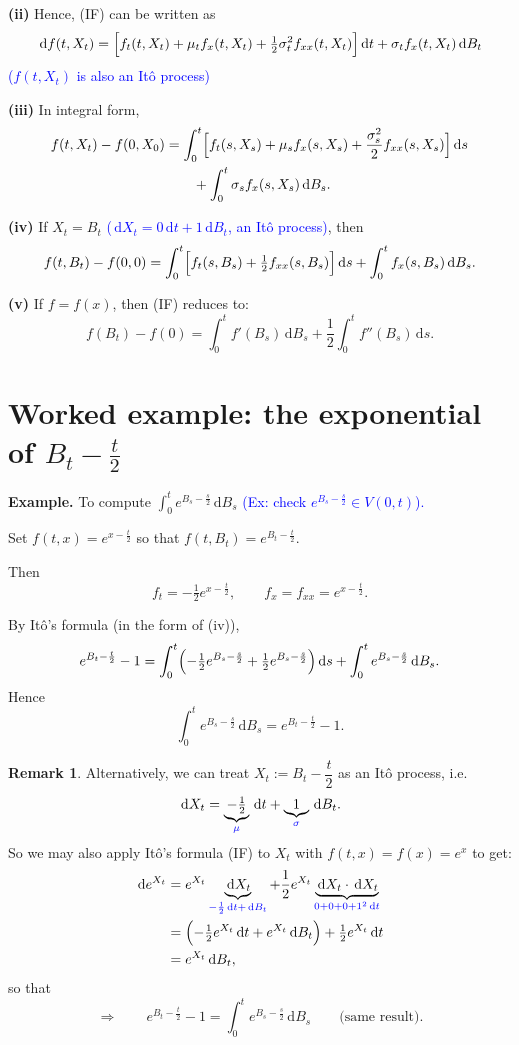 \documentclass[11pt]{article}
\newcommand{\dd}{\,\mathrm{d}}
\newcommand{\ann}[1]{\textcolor{blue}{#1}}
\theoremstyle{definition}
\newtheorem{remark}{Remark}[section]
\theoremstyle{plain}
\begin{document}
\medskip
\noindent\textbf{(ii)} Hence, (IF) can be written as
\[
  \dd f(t,X_t)=\Bigl[f_t(t,X_t)+\mu_tf_x(t,X_t)+\tfrac12\sigma_t^2f_{xx}(t,X_t)\Bigr]\dd t
  +\sigma_tf_x(t,X_t)\dd B_t
\]
\ann{($f(t,X_t)$ is also an It\^o process)}

\medskip
\noindent\textbf{(iii)} In integral form,
\begin{align*}
  f(t,X_t)-f(0,X_0)
    &=\int_0^t\Bigl[f_t(s,X_s)+\mu_sf_x(s,X_s)
       +\frac{\sigma_s^2}{2}f_{xx}(s,X_s)\Bigr]\dd s\\
    &\qquad+\int_0^t\sigma_sf_x(s,X_s)\dd B_s .
\end{align*}

\medskip
\noindent\textbf{(iv)} If $X_t=B_t$ \ann{($\dd X_t=0\dd t+1\dd B_t$, an It\^o process)}, then
\[
  f(t,B_t)-f(0,0)
  =\int_0^t\Bigl[f_t(s,B_s)+\tfrac12f_{xx}(s,B_s)\Bigr]\dd s
  +\int_0^tf_x(s,B_s)\dd B_s .
\]

\medskip
\noindent\textbf{(v)} If $f=f(x)$, then (IF) reduces to:
\[
  f(B_t)-f(0)=\int_0^tf'(B_s)\dd B_s+\frac12\int_0^tf''(B_s)\dd s .
\]

\section{Worked example: the exponential of \texorpdfstring{$B_t-\frac t2$}{B\_t - t/2}}

\noindent\textbf{Example.} To compute $\displaystyle\int_0^te^{B_s-\frac s2}\dd B_s$
\ann{(Ex: check $e^{B_s-\frac s2}\in V(0,t)$).}

\noindent Set $f(t,x)=e^{x-\frac t2}$ so that $f(t,B_t)=e^{B_t-\frac t2}$.

\noindent Then
\[
  f_t=-\tfrac12e^{x-\frac t2},\qquad f_x=f_{xx}=e^{x-\frac t2}.
\]

\noindent By It\^o's formula (in the form of (iv)),
\[
  e^{B_t-\frac t2}-1
  =\int_0^t\Bigl(-\tfrac12e^{B_s-\frac s2}+\tfrac12e^{B_s-\frac s2}\Bigr)\dd s
  +\int_0^te^{B_s-\frac s2}\dd B_s .
\]
\noindent Hence
\[
  \int_0^te^{B_s-\frac s2}\dd B_s=e^{B_t-\frac t2}-1 .
\]

\begin{remark}
Alternatively, we can treat $X_t:=B_t-\dfrac t2$ as an It\^o process, i.e.
\[
  \dd X_t=\underbrace{-\tfrac12}_{\ann{\mu}}\dd t+\underbrace{1}_{\ann{\sigma}}\dd B_t .
\]
So we may also apply It\^o's formula (IF) to $X_t$ with $f(t,x)=f(x)=e^x$ to get:
\begin{align*}
  \dd e^{X_t}
    &=e^{X_t}\underbrace{\dd X_t}_{\ann{-\frac12\dd t+\dd B_t}}
      +\frac12e^{X_t}\underbrace{\dd X_t\cdot\dd X_t}_{\ann{0+0+0+1^2\dd t}}\\
    &=\Bigl(-\tfrac12e^{X_t}\dd t+e^{X_t}\dd B_t\Bigr)+\tfrac12e^{X_t}\dd t\\
    &=e^{X_t}\dd B_t ,
\end{align*}
so that
\[
  \Longrightarrow\qquad e^{B_t-\frac t2}-1=\int_0^te^{B_s-\frac s2}\dd B_s
  \qquad\text{(same result).}
\]
\end{remark}
\end{document}
